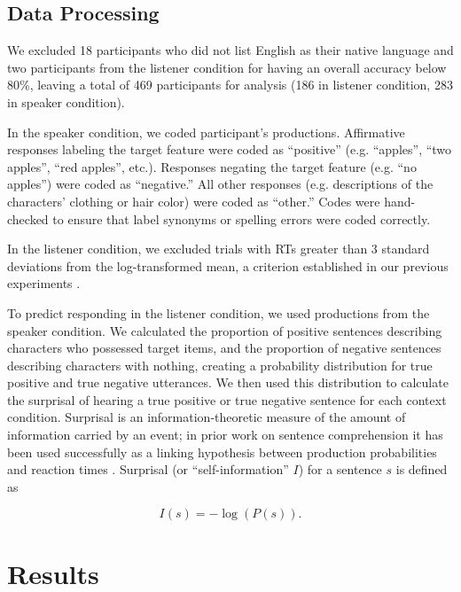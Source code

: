 \documentclass[man, noapacite]{apa2}
\begin{document}
\subsection{Data Processing} 
  
We excluded 18 participants who did not list English as their native language and two participants from the listener condition for having an overall accuracy below 80\%, leaving a total of 469 participants for analysis (186 in listener condition, 283 in speaker condition). 

In the speaker condition, we coded participant's productions. Affirmative responses labeling the target feature were coded as ``positive'' (e.g. ``apples'', ``two apples'', ``red apples'', etc.).  Responses negating the target feature (e.g. ``no apples'') were coded as ``negative.''  All other responses (e.g. descriptions of the characters' clothing or hair color) were coded as ``other.''  Codes were hand-checked to ensure that label synonyms or spelling errors were coded correctly.

In the listener condition, we excluded trials with RTs greater than 3 standard deviations from the log-transformed mean, a criterion established in our previous experiments \cite{nordmeyer2014}.  

To predict responding in the listener condition, we used productions from the speaker condition. We calculated the proportion of positive sentences describing characters who possessed target items, and the proportion of negative sentences describing characters with nothing, creating a probability distribution for true positive and true negative utterances.  We then used this distribution to calculate the surprisal of hearing a true positive or true negative sentence for each context condition. Surprisal is an information-theoretic measure of the amount of information carried by an event; in prior work on sentence comprehension it has been used successfully as a linking hypothesis between production probabilities and reaction times \cite{levy2008}. Surprisal (or ``self-information'' $I$) for a sentence $s$ is defined as

\begin{equation}
\label{eq:surprise}
I(s) = -\log(P(s)).
\end{equation}

\section{Results}
\end{document}
